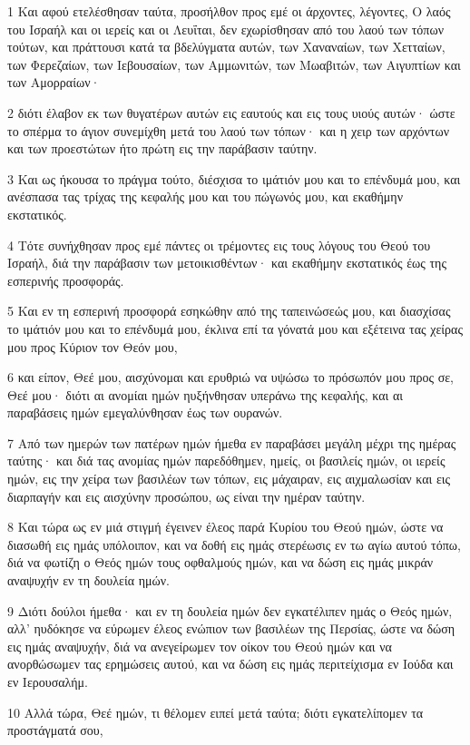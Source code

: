 \par 1 Και αφού ετελέσθησαν ταύτα, προσήλθον προς εμέ οι άρχοντες, λέγοντες, Ο λαός του Ισραήλ και οι ιερείς και οι Λευΐται, δεν εχωρίσθησαν από του λαού των τόπων τούτων, και πράττουσι κατά τα βδελύγματα αυτών, των Χαναναίων, των Χετταίων, των Φερεζαίων, των Ιεβουσαίων, των Αμμωνιτών, των Μωαβιτών, των Αιγυπτίων και των Αμορραίων·
\par 2 διότι έλαβον εκ των θυγατέρων αυτών εις εαυτούς και εις τους υιούς αυτών· ώστε το σπέρμα το άγιον συνεμίχθη μετά του λαού των τόπων· και η χειρ των αρχόντων και των προεστώτων ήτο πρώτη εις την παράβασιν ταύτην.
\par 3 Και ως ήκουσα το πράγμα τούτο, διέσχισα το ιμάτιόν μου και το επένδυμά μου, και ανέσπασα τας τρίχας της κεφαλής μου και του πώγωνός μου, και εκαθήμην εκστατικός.
\par 4 Τότε συνήχθησαν προς εμέ πάντες οι τρέμοντες εις τους λόγους του Θεού του Ισραήλ, διά την παράβασιν των μετοικισθέντων· και εκαθήμην εκστατικός έως της εσπερινής προσφοράς.
\par 5 Και εν τη εσπερινή προσφορά εσηκώθην από της ταπεινώσεώς μου, και διασχίσας το ιμάτιόν μου και το επένδυμά μου, έκλινα επί τα γόνατά μου και εξέτεινα τας χείρας μου προς Κύριον τον Θεόν μου,
\par 6 και είπον, Θεέ μου, αισχύνομαι και ερυθριώ να υψώσω το πρόσωπόν μου προς σε, Θεέ μου· διότι αι ανομίαι ημών ηυξήνθησαν υπεράνω της κεφαλής, και αι παραβάσεις ημών εμεγαλύνθησαν έως των ουρανών.
\par 7 Από των ημερών των πατέρων ημών ήμεθα εν παραβάσει μεγάλη μέχρι της ημέρας ταύτης· και διά τας ανομίας ημών παρεδόθημεν, ημείς, οι βασιλείς ημών, οι ιερείς ημών, εις την χείρα των βασιλέων των τόπων, εις μάχαιραν, εις αιχμαλωσίαν και εις διαρπαγήν και εις αισχύνην προσώπου, ως είναι την ημέραν ταύτην.
\par 8 Και τώρα ως εν μιά στιγμή έγεινεν έλεος παρά Κυρίου του Θεού ημών, ώστε να διασωθή εις ημάς υπόλοιπον, και να δοθή εις ημάς στερέωσις εν τω αγίω αυτού τόπω, διά να φωτίζη ο Θεός ημών τους οφθαλμούς ημών, και να δώση εις ημάς μικράν αναψυχήν εν τη δουλεία ημών.
\par 9 Διότι δούλοι ήμεθα· και εν τη δουλεία ημών δεν εγκατέλιπεν ημάς ο Θεός ημών, αλλ' ηυδόκησε να εύρωμεν έλεος ενώπιον των βασιλέων της Περσίας, ώστε να δώση εις ημάς αναψυχήν, διά να ανεγείρωμεν τον οίκον του Θεού ημών και να ανορθώσωμεν τας ερημώσεις αυτού, και να δώση εις ημάς περιτείχισμα εν Ιούδα και εν Ιερουσαλήμ.
\par 10 Αλλά τώρα, Θεέ ημών, τι θέλομεν ειπεί μετά ταύτα; διότι εγκατελίπομεν τα προστάγματά σου,
